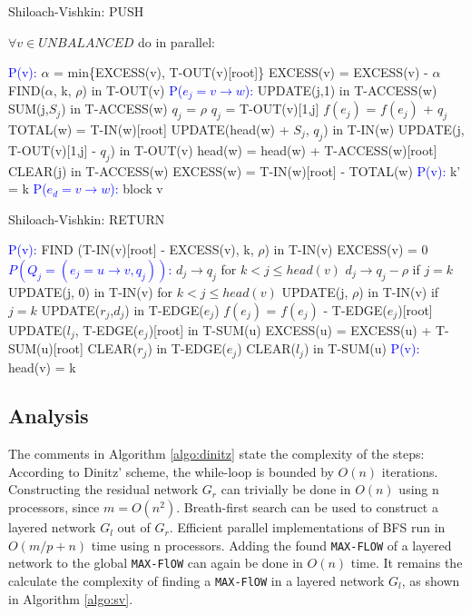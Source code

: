 \documentclass[a4paper,10pt, twocolumn]{article}
\begin{document}
\begin{algorithm}
\caption{Shiloach-Vishkin: PUSH}
\label{algo:sv_push}
$\forall v \in UNBALANCED$ do in parallel:
\begin{algorithmic}[1]
		\State \textcolor{blue}{P(v):}
		\State $\alpha$ = min\{EXCESS(v), T-OUT(v)[root]\} 
		\State EXCESS(v) = EXCESS(v) - $\alpha$
		\State FIND($\alpha$, k, $\rho$) in T-OUT(v)
		\State \textcolor{blue}{P($e_j = v \rightarrow w$):}
 		\State UPDATE(j,1) in T-ACCESS(w)
		\State SUM(j,$S_j$) in T-ACCESS(w)
			$q_j$ = $\rho$
		\Else
			\State $q_j$ = T-OUT(v)[1,j]
		\EndIf
		\State $f(e_j)$ = $f(e_j)$ + $q_j$
		\State TOTAL(w) = T-IN(w)[root]
		\State UPDATE(head(w) + $S_j$, $q_j$) in T-IN(w)
		\State UPDATE(j, T-OUT(v)[1,j] - $q_j$) in T-OUT(v)
		\State head(w) = head(w) + T-ACCESS(w)[root] 
		\State CLEAR(j) in T-ACCESS(w)
		\State EXCESS(w) = T-IN(w)[root] - TOTAL(w)
		\EndIf
		\State \textcolor{blue}{P(v):} k' = k
		\State \textcolor{blue}{P($e_d = v \rightarrow w$):}
			\State block v
		\EndIf
 	\EndFunction
\end{algorithmic}
\end{algorithm}


\begin{algorithm}
\caption{Shiloach-Vishkin: RETURN}
\label{algo:sv_return}
\begin{algorithmic}[1]
		\State \textcolor{blue}{P(v):}
		\State FIND (T-IN(v)[root] - EXCESS(v), k, $\rho$) in T-IN(v)
		\State EXCESS(v) = 0
		\State \textcolor{blue}{$P(Q_j = (e_j = u \rightarrow v, q_j))$:}
		\State $d_j \rightarrow q_j$ for $k < j \leq head(v)$
		\State $d_j \rightarrow q_j - \rho$ if $j = k$
		\State UPDATE(j, 0) in T-IN(v) for $k < j \leq head(v)$
		\State UPDATE(j, $\rho$) in T-IN(v) if $j = k$
		\State UPDATE($r_j$,$d_j$) in T-EDGE($e_j$)
		\State $f(e_j)$ = $f(e_j)$ - T-EDGE($e_j$)[root]
		\State UPDATE($l_j$, T-EDGE($e_j$)[root] in T-SUM(u)
		\State EXCESS(u) = EXCESS(u) + T-SUM(u)[root]
		\State CLEAR($r_j$) in T-EDGE($e_j$)
		\State CLEAR($l_j$) in T-SUM(u)
		\State \textcolor{blue}{P(v):}
		\State head(v) = k
	\EndFunction
\end{algorithmic}
\end{algorithm}

\subsection{Analysis}
\label{sec:sv_analysis}
The comments in Algorithm \ref{algo:dinitz} state the complexity of the steps: According to Dinitz' scheme, the while-loop is bounded by $O(n)$ iterations. Constructing the residual network $G_r$ can trivially be done in $O(n)$ using n processors, since $m = O(n^{2})$. Breath-first search can be used to construct a layered network $G_l$ out of $G_r$. Efficient parallel implementations of BFS run in $O(m/p +n)$ time using n processors. Adding the found \lstinline|MAX-FLOW| of a layered network to the global \lstinline|MAX-FlOW| can again be done in $O(n)$ time. It remains the calculate the complexity of finding a \lstinline|MAX-FlOW| in a layered network $G_l$, as shown in Algorithm \ref{algo:sv}.
\end{document}
